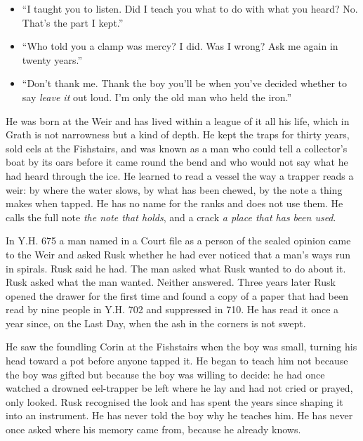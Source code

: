 \documentclass{design/chronicle}
\begin{document}
{\begin{itemize}[leftmargin=1.4em,itemsep=1pt,topsep=3pt,parsep=0pt]
\item “I taught you to listen. Did I teach you what to do with what you heard? No. That’s the part I kept.”

\item “Who told you a clamp was mercy? I did. Was I wrong? Ask me again in twenty years.”

\item “Don’t thank me. Thank the boy you’ll be when you’ve decided whether to say \emph{leave it} out loud. I’m only the old man who held the iron.”

\end{itemize}

He was born at the Weir and has lived within a league of it all his life, which in Grath is not narrowness but a kind of depth. He kept the traps for thirty years, sold eels at the Fishstairs, and was known as a man who could tell a collector’s boat by its oars before it came round the bend and who would not say what he had heard through the ice. He learned to read a vessel the way a trapper reads a weir: by where the water slows, by what has been chewed, by the note a thing makes when tapped. He has no name for the ranks and does not use them. He calls the full note \emph{the note that holds}, and a crack \emph{a place that has been used}.

In Y.H. 675 a man named in a Court file as a person of the sealed opinion came to the Weir and asked Rusk whether he had ever noticed that a man’s ways run in spirals. Rusk said he had. The man asked what Rusk wanted to do about it. Rusk asked what the man wanted. Neither answered. Three years later Rusk opened the drawer for the first time and found a copy of a paper that had been read by nine people in Y.H. 702 and suppressed in 710. He has read it once a year since, on the Last Day, when the ash in the corners is not swept.

He saw the foundling Corin at the Fishstairs when the boy was small, turning his head toward a pot before anyone tapped it. He began to teach him not because the boy was gifted but because the boy was willing to decide: he had once watched a drowned eel-trapper be left where he lay and had not cried or prayed, only looked. Rusk recognised the look and has spent the years since shaping it into an instrument. He has never told the boy why he teaches him. He has never once asked where his memory came from, because he already knows.

}
\end{document}
